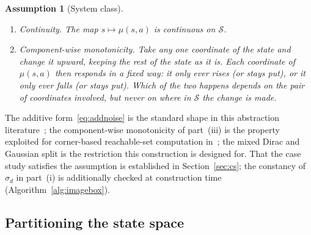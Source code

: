 \documentclass[11pt,a4paper]{article}
\newcommand{\R}{\mathbb{R}}
\theoremstyle{plain}
\newtheorem{assumption}{Assumption}
\theoremstyle{remark}
\begin{document}
\begin{assumption}[System class]
\begin{enumerate}[label=(\roman*)]
\begin{equation}
				\label{eq:kernelfactor}
			\end{equation}
			where
			\begin{itemize}
				\item $T_x$ is the one-step kernel of~\eqref{eq:dtshs-kernel};\item $A_d \subseteq \R$ is an interval of values for coordinate $d$
				of the successor state;
				\item $A_1 \times \dots \times A_n$ is the region of states that meet
				all $n$ of these interval conditions at once, one per coordinate;
				\item $T_{x,d}(A_d \mid s, a)$ is the probability that coordinate $d$
				of the successor state falls in $A_d$. In a deterministic dimension
				the coordinate is exactly $\mu_d(s, a)$, so this probability is $1$
				if $\mu_d(s, a)$ lies in $A_d$ and $0$ if it does not. In a stochastic
				dimension the coordinate is $\mu_d(s, a)$ plus the noise $w_d$, so it
				is the probability that this noisy value lands in $A_d$.
			\end{itemize}
			\item \emph{Continuity.} The map $s \mapsto \mu(s, a)$ is continuous on
			$\mathcal{S}$.
			
			\item \emph{Component-wise monotonicity.} Take any one coordinate of
			the state and change it upward, keeping the rest of the state as it
			is. Each coordinate of $\mu(s, a)$ then responds in a fixed way: it
			only ever rises (or stays put), or it only ever falls (or stays put).
			Which of the two happens depends on the pair of coordinates involved,
			but never on where in $\mathcal{S}$ the change is made.
			
		\end{enumerate}
	\end{assumption}
	
	The additive form~\eqref{eq:addnoise} is the standard shape in this
	abstraction literature~\cite{Soudjani2013}; the component-wise
	monotonicity of part~(iii) is the property exploited for corner-based
	reachable-set computation in~\cite{CA15}; the mixed Dirac and Gaussian
	split is the restriction this construction is designed for. That the
	case study satisfies the assumption is established in
	Section~\ref{sec:cs}; the constancy of $\sigma_d$ in part~(i) is
	additionally checked at construction time (Algorithm~\ref{alg:imagebox}).
	
	\subsection{Partitioning the state space}
	\label{sec:abs:partition}
	
\end{document}
